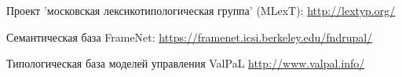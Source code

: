 \noindent \hypertarget{mlext}{Проект 'московская лексикотипологическая группа' (MLexT)}:\; \url{http://lextyp.org/} \medskip


\noindent \hypertarget{fn}{Семантическая база FrameNet:}\; \url{https://framenet.icsi.berkeley.edu/fndrupal/} \medskip

\noindent \hypertarget{valpal}{Типологическая база моделей управления ValPaL}\; \url{http://www.valpal.info/} \medskip


